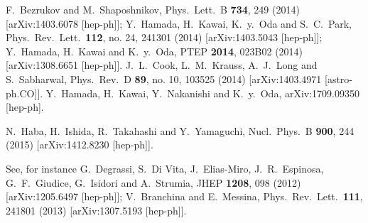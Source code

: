 \documentclass[aps,prd,preprint,superscriptaddress,showpacs,ctexart]{revtex4-1}
\begin{document}
\begin{thebibliography}{10}

 F.~Bezrukov and M.~Shaposhnikov, %
 Phys.\ Lett.\ B \textbf{734}, 249 (2014) %
 {[}arXiv:1403.6078 {[}hep-ph{]}{]}; %
 Y.~Hamada, H.~Kawai, K.~y.~Oda and S.~C.~Park, %
 Phys.\ Rev.\ Lett.\ \textbf{112}, no. 24, 241301 (2014) %
 {[}arXiv:1403.5043 {[}hep-ph{]}{]}; %
 Y.~Hamada, H.~Kawai and K.~y.~Oda, %
 PTEP \textbf{2014}, 023B02 (2014) %
 {[}arXiv:1308.6651 {[}hep-ph{]}{]}. %
 J.~L.~Cook, L.~M.~Krauss, A.~J.~Long and S.~Sabharwal, %
 Phys.\ Rev.\ D \textbf{89}, no. 10, 103525 (2014) %
 {[}arXiv:1403.4971 {[}astro-ph.CO{]}{]}. %
 Y.~Hamada, H.~Kawai, Y.~Nakanishi and K.~y.~Oda, %
 arXiv:1709.09350 {[}hep-ph{]}. %


 N.~Haba, H.~Ishida, R.~Takahashi and Y.~Yamaguchi,
 Nucl.\ Phys.\ B \textbf{900}, 244 (2015) %
 {[}arXiv:1412.8230 {[}hep-ph{]}{]}. %

 See, for instance G.~Degrassi, S.~Di
Vita, J.~Elias-Miro, J.~R.~Espinosa, G.~F.~Giudice, G.~Isidori
and A.~Strumia, %
 JHEP \textbf{1208}, 098 (2012) %
 {[}arXiv:1205.6497 {[}hep-ph{]}{]}; %
 V.~Branchina and E.~Messina, %
 Phys.\ Rev.\ Lett.\ \textbf{111}, 241801 (2013) %
 {[}arXiv:1307.5193 {[}hep-ph{]}{]}. %


\end{thebibliography}
\end{document}
